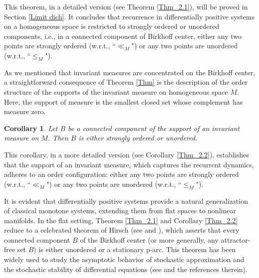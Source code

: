 \documentclass[a4paper,11pt]{article}
\theoremstyle{plain}
\newtheorem{coro}{Corollary}[subsection]
\theoremstyle{definition}
\numberwithin{equation}{section}
\begin{document}
This theorem, in a detailed version (see Theorem \ref{Thm_2.1}), will be proved in Section \ref{Limit dich}. It concludes that recurrence in differentially positive systems on a homogeneous space is restricted to strongly ordered or unordered components, i.e., in a connected component of Birkhoff center, either any two points are strongly ordered (w.r.t., ``$\ll_M$") or any two points are unordered (w.r.t., ``$\leq_M$").


As we mentioned that invariant measures are concentrated on the Birkhoff center,
a straightforward consequence of Theorem \ref{Thm} is the description of the order structure of the supports of the invariant measure on homogeneous space $M$. Here, the support of measure is the smallest closed set whose complement has measure zero.


\renewcommand{\thecoro}{\Alph{coro}}
\setcounter{coro}{1} 


\begin{coro}
	Let $B$ be a connected component of the support of an invariant measure on $M$. Then $B$ is either strongly ordered or unordered.
\end{coro}



This corollary, in a more detailed version (see Corollary \ref{Thm_2.2}), establishes  that the support of an invariant measure, which captures the recurrent dynamics, adheres to an order configuration: either any two points are strongly ordered (w.r.t., ``$\ll_M$") or any two points are unordered (w.r.t., ``$\leq_M$").



It is evident that differentially positive systems provide a natural generalization of classical monotone systems, extending them from flat spaces to nonlinear manifolds. In the flat setting, Theorem \ref{Thm_2.1} and Corollary \ref{Thm_2.2} reduce to a celebrated theorem of Hirsch (see \cite[Theorem 1.6]{H99} and \cite{Mi00}), which asserts that every connected component $B$ of the Birkhoff center (or more generally, any attractor-free set $B$) is either unordered or a stationary p-arc. This theorem has been widely used to study the asymptotic behavior of stochastic approximation and the stochastic stability of differential equations (see \cite{B00,BF21,BH99,JWS26} and the references therein).
\end{document}
